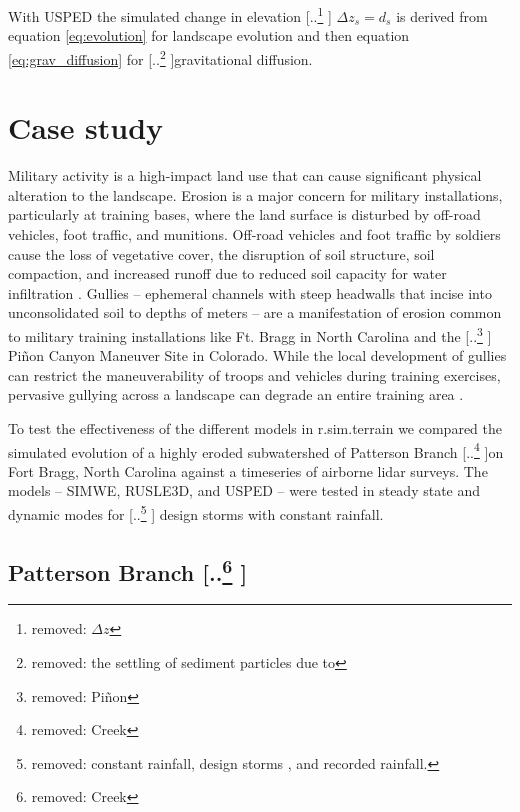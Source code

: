 \documentclass[gmd, manuscript]{copernicus}
\providecommand{\DIFadd}[1]{{\protect\color{blue} \sf #1}} %
\providecommand{\DIFdel}[1]{{\protect\color{red} [..\footnote{removed: #1} ]}} %
\providecommand{\DIFaddbegin}{} %
\providecommand{\DIFaddend}{} %
\providecommand{\DIFdelbegin}{} %
\providecommand{\DIFdelend}{} %
\begin{document}
\noindent
With USPED the simulated change in elevation \DIFdelbegin \DIFdel{$\Delta z$
}\DIFdelend \DIFaddbegin \DIFadd{$\Delta z_s=d_s$
}\DIFaddend is derived from equation \ref{eq:evolution} for landscape evolution
and then equation \ref{eq:grav_diffusion}
for \DIFdelbegin \DIFdel{the settling of sediment particles due to }\DIFdelend gravitational diffusion.


\section{Case study} 

Military activity is a high-impact land use 
that can cause significant physical alteration to the landscape. 
Erosion is a major concern for military installations, 
particularly at training bases, 
where the land surface is disturbed by 
off-road vehicles, foot traffic, and munitions. 
Off-road vehicles and foot traffic by soldiers 
cause the loss of vegetative cover, 
the disruption of soil structure, soil compaction, 
and increased runoff due to 
reduced soil capacity for water infiltration 
\citep{Webb1983, McDonald2004}.
Gullies -- ephemeral channels with steep headwalls 
that incise into unconsolidated soil to depths of meters -- 
are a manifestation of erosion common to 
military training installations like Ft. Bragg in North Carolina 
and the \DIFdelbegin \DIFdel{Piñon }\DIFdelend \DIFaddbegin \DIFadd{Pi\~{n}on }\DIFaddend Canyon Maneuver Site in Colorado. 
While the local development of gullies can restrict 
the maneuverability of troops and vehicles during training exercises, 
pervasive gullying across a landscape 
can degrade an entire training area 
\citep{Huang2014}.

To test the effectiveness of the different models 
in r.sim.terrain
we compared the simulated evolution
of a highly eroded subwatershed of 
Patterson Branch \DIFdelbegin \DIFdel{Creek }\DIFdelend on Fort Bragg, North Carolina
against a timeseries of airborne lidar surveys.
The models -- SIMWE, RUSLE3D, and USPED --
were tested in steady state and dynamic modes
for \DIFdelbegin \DIFdel{constant rainfall, design storms , and recorded rainfall.
}\DIFdelend \DIFaddbegin \DIFadd{design storms with constant rainfall.
}\DIFaddend 

\subsection{Patterson Branch\DIFdelbegin \DIFdel{Creek}\DIFdelend }
\end{document}
